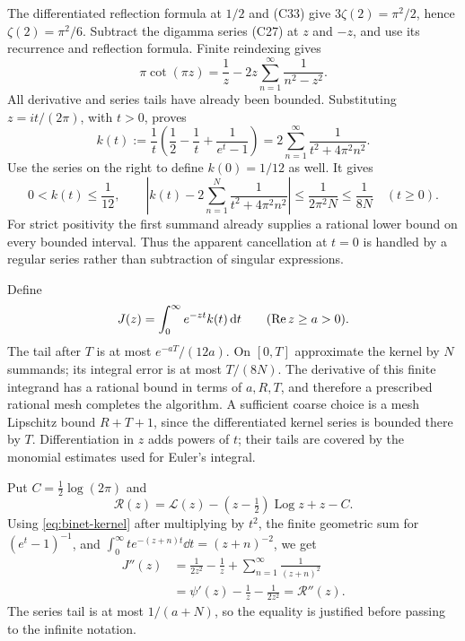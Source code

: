 The differentiated reflection formula at $1/2$ and (C33) give
$3\zeta(2)=\pi^2/2$, hence $\zeta(2)=\pi^2/6$.
Subtract the digamma series (C27) at $z$ and $-z$, and use its recurrence
and reflection formula. Finite reindexing gives
\[
 \pi\cot(\pi z)=\frac1z-
                     2z\sum_{n=1}^{\infty}\frac1{n^2-z^2}.
\]
All derivative and series tails have already been bounded. Substituting
$z=it/(2\pi)$, with $t>0$, proves
\begin{equation}
 k(t):=\frac1t\left(\frac12-\frac1t+\frac1{e^t-1}\right)
       =2\sum_{n=1}^{\infty}\frac1{t^2+4\pi^2n^2}.
 \label{eq:binet-kernel}
\end{equation}
Use the series on the right to define $k(0)=1/12$ as well. It gives
\begin{equation}
 0<k(t)\le\frac1{12},\qquad
 \left|k(t)-2\sum_{n=1}^{N}\frac1{t^2+4\pi^2n^2}\right|
 \le\frac1{2\pi^2N}\le\frac1{8N}\quad(t\ge0).
 \label{eq:binet-kernel-tail}
\end{equation}
For strict positivity the first summand already supplies a rational
lower bound on every bounded interval. Thus the apparent cancellation
at $t=0$ is handled by a regular series rather than subtraction of
singular expressions.

Define
\[
 J(z)=\int_0^\infty e^{-zt}k(t)\,\mathrm d t\qquad(\operatorname{Re} z\ge a>0).
\]
The tail after $T$ is at most $e^{-aT}/(12a)$. On $[0,T]$ approximate
the kernel by $N$ summands; its integral error is at most $T/(8N)$.
The derivative of this finite integrand has a rational bound in terms
of $a,R,T$, and therefore a prescribed rational mesh completes the
algorithm. A sufficient coarse choice is a mesh Lipschitz bound
$R+T+1$, since the differentiated kernel series is bounded there by
$T$. Differentiation in $z$ adds powers of $t$; their tails are covered
by the monomial estimates used for Euler's integral.

Put $C=\tfrac12\log(2\pi)$ and
\[
 \mathcal R(z)=\mathcal L(z)-(z-\tfrac12)\operatorname{Log}z+z-C.
\]
Using \eqref{eq:binet-kernel} after multiplying by $t^2$, the finite
geometric sum for $(e^t-1)^{-1}$, and
$\int_0^\infty te^{-(z+n)t}\dd t=(z+n)^{-2}$, we get
\begin{align*}
 J''(z)
 &=\frac1{2z^2}-\frac1z+\sum_{n=1}^{\infty}\frac1{(z+n)^2}\\
 &=\psi'(z)-\frac1z-\frac1{2z^2}=\mathcal R''(z).
\end{align*}
The series tail is at most $1/(a+N)$, so the equality is justified
before passing to the infinite notation.

